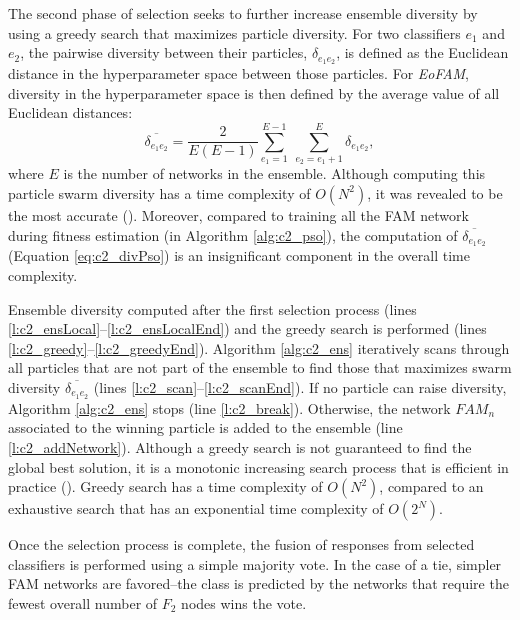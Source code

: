 The second phase of selection seeks to further increase ensemble diversity by using a greedy search that maximizes particle diversity.
For two classifiers $e_1$ and $e_2$, the pairwise diversity between their particles, $\delta_{e_1e_2}$, is defined as the Euclidean distance in the hyperparameter space between those particles.
For \textit{EoFAM}, diversity in the hyperparameter space is then defined by the average value of all Euclidean distances: 
\begin{equation}
  \overline{\delta_{e_1e_2}} = \frac{2}{E (E-1)}
							\displaystyle\sum_{e_1=1}^{E-1} \:
  						\displaystyle\sum_{e_2=e_1+1}^{E} \delta_{e_1e_2},
	\label{eq:c2_divPso}
\end{equation}
where $E$ is the number of networks in the ensemble.
Although computing this particle swarm diversity has a time complexity of $O(N^2)$, it was revealed to be the most accurate (\cite{orlunda08}).
Moreover, compared to training all the FAM network during fitness estimation (in Algorithm \ref{alg:c2_pso}), the computation of $\overline{\delta_{e_1e_2}}$ (Equation \ref{eq:c2_divPso}) is an insignificant component in the overall time complexity.  

Ensemble diversity computed after the first selection process (lines \ref{l:c2_ensLocal}--\ref{l:c2_ensLocalEnd}) and the greedy search is performed (lines \ref{l:c2_greedy}--\ref{l:c2_greedyEnd}).
Algorithm \ref{alg:c2_ens} iteratively scans through all particles that are not part of the ensemble to find those that maximizes swarm diversity $\overline{\delta_{e_1e_2}}$ (lines \ref{l:c2_scan}--\ref{l:c2_scanEnd}).
If no particle can raise diversity, Algorithm \ref{alg:c2_ens} stops (line \ref{l:c2_break}).
Otherwise, the network $\textit{FAM}_n$ associated to the winning particle is added to the ensemble (line \ref{l:c2_addNetwork}).
Although a greedy search is not guaranteed to find the global best solution, it is a monotonic increasing search process that is efficient in practice (\cite{ulas09}).
Greedy search has a time complexity of $O(N^2)$, compared to an exhaustive search that has an exponential time complexity of $O(2^N)$.

Once the selection process is complete, the fusion of responses from selected classifiers is performed using a simple majority vote.
In the case of a tie, simpler FAM networks are favored--the class is predicted by the networks that require the fewest overall number of $F_2$ nodes wins the vote.


